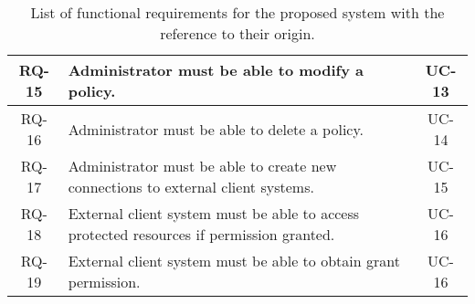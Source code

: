 \begin{table}[H]
\begin{tabular}{|c|p{12cm}|c|}
    \hline
    RQ-15&Administrator must be able to modify a policy.&UC-13\\
    \hline
    RQ-16&Administrator must be able to delete a policy.&UC-14\\
    \hline
    \hline
    RQ-17&Administrator must be able to create new connections to external client systems.&UC-15\\
    \hline
    \hline
    RQ-18&External client system must be able to access protected resources if permission granted.&UC-16\\
    \hline
    RQ-19&External client system must be able to obtain grant permission.&UC-16\\
    \hline
    \end{tabular}
    \caption{List of functional requirements for the proposed system with the reference to their origin.}
    \label{tab:functional-requirements}
\end{table}